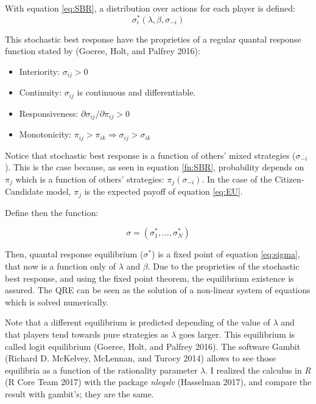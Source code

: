 With equation \ref{eq:SBR}, a distribution over actions for each player
is defined: \[\sigma^*_{i}(\lambda, \beta, \sigma_{-i})\]

This stochastic best response have the proprieties of a regular quantal
response function stated by (Goeree, Holt, and Palfrey 2016):

\begin{itemize}
	\item Interiority: $\sigma_{ij} >0$
	\item Continuity: $\sigma_{ij}$ is continuous and differentiable. 
	\item Responsiveness:  $\partial \sigma_{ij} / \partial \pi_{ij} >0 $
	\item Monotonicity: $\pi_{ij}> \pi_{ik} \Rightarrow \sigma_{ij}>\sigma_{ik}$
\end{itemize}

Notice that stochastic best response is a function of others' mixed
strategies (\(\sigma_{-i}\)). This is the case because, as seen in
equation \ref{fn:SBR}, probability depends on \(\pi_{j}\) which is a
function of others' strategies: \(\pi_{j}(\sigma_{-i})\). In the case of
the Citizen-Candidate model, \(\pi_j\) is the expected payoff of
equation \ref{eq:EU}.

Define then the function:

\begin{equation}\label{eq:sigma}
\sigma = (\sigma^*_{1}, ..., \sigma^*_{N})
\end{equation}

Then, quantal response equilibrium (\(\sigma^*\)) is a fixed point of
equation \ref{eq:sigma}, that now is a function only of \(\lambda\) and
\(\beta\). Due to the proprieties of the stochastic best response, and
using the fixed point theorem, the equilibrium existence is assured.
The QRE can be seen as the solution of a non-linear system of equations which is solved numerically. 

Note that a different equilibrium is predicted depending of the value of
\(\lambda\) and that players tend towards pure strategies as \(\lambda\)
goes larger. This equilibrium is called logit equilibrium (Goeree, Holt,
and Palfrey 2016). The software Gambit (Richard D. McKelvey, McLennan,
and Turocy 2014) allows to see those equilibria as a function of the
rationality parameter \(\lambda\). I realized the calculus in \emph{R}
(R Core Team 2017) with the package \emph{nleqslv} (Hasselman 2017), and
compare the result with gambit's; they are the same.

